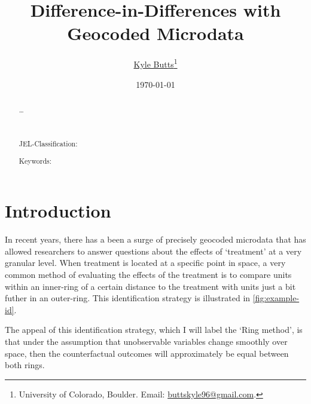 \documentclass[10pt]{article}
\title{Difference-in-Differences with Geocoded Microdata}
\author{\href{https://kylebutts.com/}{Kyle Butts}\thanks{University of Colorado, Boulder. Email: \href{mailto:buttskyle96@gmail.com}{buttskyle96@gmail.com}.} %
}
\date{\today}
\begin{document}
\maketitle

\begin{abstract}
    \dots

    \par~\par\noindent
    JEL-Classification: 
    \par\noindent
    Keywords: 
    \par
\end{abstract}
\newpage


\section{Introduction}

In recent years, there has a been a surge of precisely geocoded microdata that has allowed researchers to answer questions about the effects of `treatment' at a very granular level. When treatment is located at a specific point in space, a very common method of evaluating the effects of the treatment is to compare units within an inner-ring of a certain distance to the treatment with units just a bit futher in an outer-ring. This identification strategy is illustrated  in \autoref{fig:example-id}.

The appeal of this identification strategy, which I will label the `Ring method', is that under the assumption that unobservable variables change smoothly over space, then the counterfactual outcomes will approximately be equal between both rings.

\end{document}
